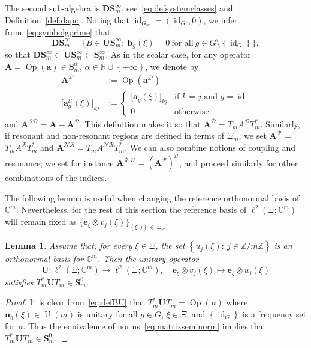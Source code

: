 \documentclass[10pt]{amsart}
\newtheorem{lemm}[theo]{Lemma}\newtheorem{prop}[theo]{Proposition}\newtheorem{coro}[theo]{Corollary}\newtheorem{conj}[theo]{Conjecture}
\theoremstyle{definition}\newtheorem{defi}[theo]{Definition}\newtheorem{rema}[theo]{Remark}\newtheorem{exam}[theo]{Example}\newtheorem{nota}[theo]{Notation}
\DeclareMathOperator{\Op}{Op}
\DeclareMathOperator{\id}{id}
\newcommand{\R}{\mathbb R}
\newcommand{\C}{\mathbb C}
\newcommand{\Z}{\mathbb Z}
\newcommand{\CD}{\mathcal{D}}
\newcommand{\CN}{\mathcal{N}}
\newcommand{\CO}{\mathcal{O}}
\newcommand{\CR}{\mathcal{R}}
\newcommand{\CU}{\mathcal{U}}
\newcommand{\CNR}{{\CN\!\CR}}
\newcommand{\ba}{\mathbf a}
\newcommand{\BA}{\mathbf A}
\newcommand{\BD}{\mathbf D}
\newcommand{\BS}{\mathbf S}
\newcommand{\BU}{\mathbf U}
\newcommand{\bbb}{\mathbf b}
\newcommand{\be}{\mathbf e}
\newcommand{\bu}{\mathbf u}
\renewcommand{\subseteq}{\subset}
\newcommand{\set}[1]{\left\{ #1 \right\}}
\begin{document}
The second sub-algebra is $\BD\BS_m^\infty$, see~\eqref{eq:defsystemclasses} and Definition~\ref{def:dapo}. Noting that $\id_{G_m}=(\id_G,0)$, we infer from~\eqref{eq:symbolgprime} that
\begin{equation}
\BD\BS_m^\infty=\big\{B\in\BU\BS_m^\infty:\ \bbb_g(\xi)=0\ \text{for all} \ g\in G\setminus \set{\id_G}\big\},
\end{equation}
so that $\BD\BS_m^\infty \subseteq \BU\BS_m^\infty \subseteq \BS_m^\infty$. As in the scalar case, for any operator $\BA =\Op(\ba)\in \BS_m^\alpha$, $\alpha\in\R\cup\set{\pm\infty}$, we denote by
\begin{equation}\label{eq:diagonalmatrix}
\begin{split}
\BA^\CD &:=\Op(\ba^\CD)\quad\\ \big[\ba_g^\CU(\xi)\big]_{k j}&:=
\begin{cases}
\big[\ba_g(\xi)\big]_{k j} & \text{if }k =j
\text{ and } g = \id\\ 0 &
\text{otherwise}.
\end{cases}
\end{split}
\end{equation}
and $\BA^{\CO\CD} = \BA - \BA^\CD$. This definition makes it so that $\BA^\CD = T_m A^\CD T_m^*$. Similarly, if resonant and non-resonant regions are defined in terms of $\Xi_m$, we set $\BA^\CR$ = $T_mA^\CR T_m^*$ and $\BA^{\CNR} = T_m A^{\CNR} T_m^*$. We can also combine notions of coupling and resonance; we set for instance $\BA^{\CR,\CU} = (\BA^{\CR})^\CU$, and proceed similarly for other combinations of the indices.



The following lemma is useful when changing the reference orthonormal basis of $\C^m$. Nevertheless, for the rest of this section the reference basis of $\ell^2(\Xi;\C^m)$ will remain fixed as $\{\be_\xi\otimes v_j(\xi)\}_{(\xi,j)\,\in\,\Xi_m}$.
\begin{lemm}
Assume that, for every $\xi\in\Xi$, the set $\set{u_j(\xi):\ j\in \Z/m\Z}$ is an orthonormal basis for $\C^m$. Then the unitary operator
\begin{equation}\label{eq:defBU}
\BU:\ell^2\left(\Xi;\C^m\right) \to \ell^2\left(\Xi;\C^m\right), \quad \be_\xi\otimes v_j(\xi)\mapsto \be_\xi\otimes u_j(\xi)
\end{equation}
satisfies $T_m^*\BU T_m\in\BS_m^0$.
\end{lemm}
\begin{proof}
It is clear from~\eqref{eq:defBU} that $T_m^*\BU T_m=\Op(\bu)$ where $\bu_g(\xi)\in \operatorname{U}(m)$ is unitary for all $g\in G$, $\xi\in\Xi$, and $\set{\id_G}$ is a frequency set for $\bu$. Thus the equivalence of norms~\eqref{eq:matrixseminorm} implies that $T_m^*\BU T_m\in\BS_m^0$.
\end{proof}
\end{document}
